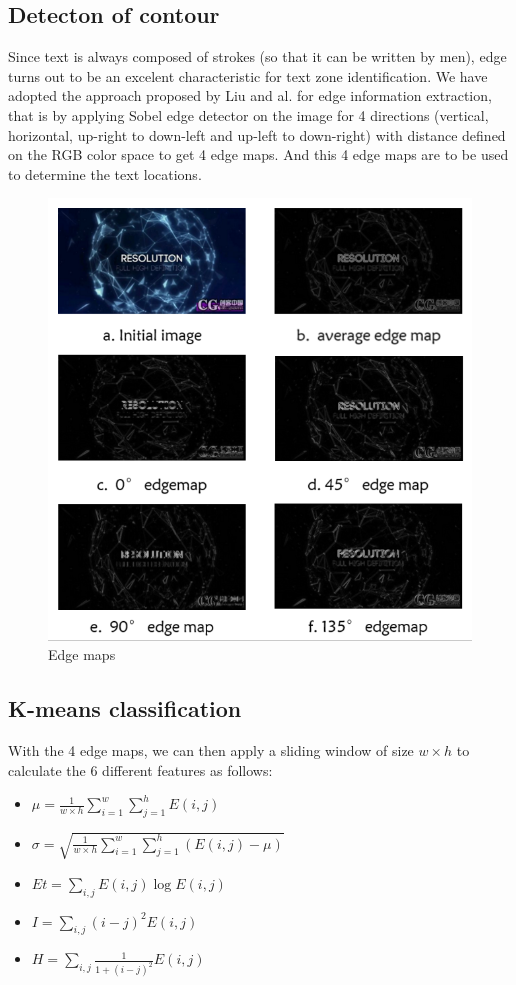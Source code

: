 \documentclass[paper=a4, french, 11pt]{scrartcl}
\begin{document}
\subsection{Detecton of contour}
Since text is always composed of strokes (so that it can be written by men), edge turns out to be an excelent characteristic for text zone identification. We have adopted the approach proposed by Liu and al. for edge information extraction, that is by applying Sobel edge detector on the image for 4 directions (vertical, horizontal, up-right to down-left and up-left to down-right) with distance defined on the RGB color space to get 4 edge maps. And this 4 edge maps are to be used to determine the text locations.

\begin{figure}[h]
\begin{center}
	\vspace{-1ex}
   \includegraphics[width=0.75\linewidth]{edge_filter_example.png}
\end{center}
\vspace{-4ex}
\caption{Edge maps}
\label{fig:heatmap}
\end{figure}

\subsection{K-means classification}
With the 4 edge maps, we can then apply a sliding window of size $w \times h$ to calculate the 6 different features as follows:

\begin{itemize}
\item $\mu = \frac{1}{w \times h} \sum_{i=1}^{w} \sum_{j=1}^{h} E(i,j)$

\item $\sigma =\sqrt{\frac{1}{w \times h} \sum_{i=1}^{w} \sum_{j=1}^{h} (E(i,j) - \mu)}$

\item $ Et = \sum_{i,j} E(i,j)\log E(i,j) $

\item $ I = \sum_{i,j} (i-j)^2 E(i,j)$

\item $ H = \sum_{i,j} \frac{1}{1+(i-j)^2}E(i,j)$
\end{itemize}
\end{document}
